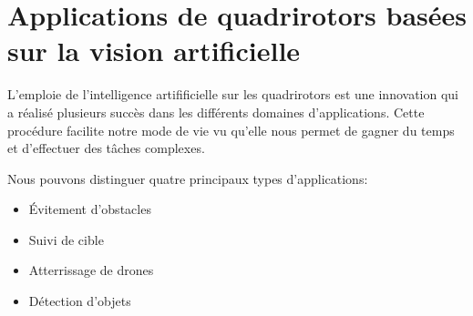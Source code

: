 \section{Applications de quadrirotors basées sur la vision artificielle}
L'emploie de l'intelligence artifificielle sur les quadrirotors est une innovation qui a réalisé plusieurs succès dans les différents domaines d'applications. Cette procédure facilite notre mode de vie vu qu'elle nous permet de gagner du temps et d'effectuer des tâches complexes.

Nous pouvons distinguer quatre principaux types d'applications:   
\begin{itemize}
	\item Évitement d’obstacles 
	\item Suivi de cible
	\item Atterrissage de drones 
	\item Détection d’objets 
\end{itemize}


